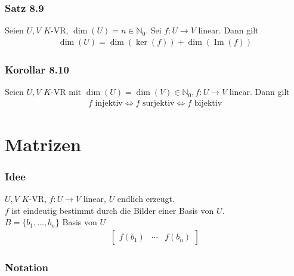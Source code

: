 \documentclass[a5paper, 10pt]{book}
\DeclareMathOperator{\romanIm}{Im}
\newcommand{\inN}{\in\mathbb{N}}
\begin{document}
			\subsubsection{Satz 8.9}
				Seien $U,V$ $K$-VR, $\dim(U) = n \inN_0$. Sei $f: U \to V$ linear. Dann gilt
					\begin{align}
						\dim(U) = \dim(\ker(f)) + \dim(\romanIm(f))
					\end{align}
				
			\subsubsection{Korollar 8.10}
				Seien $U,V$ $K$-VR mit $\dim(U) = \dim(V) \inN_0, f: U \to V$ linear. Dann gilt
				\begin{align}
					f \text{ injektiv} \Longleftrightarrow f \text{ surjektiv} \Longleftrightarrow f \text{ bijektiv}
				\end{align}
			
		\section{Matrizen}
			
			\subsubsection{Idee}
				$U,V$ $K$-VR, $f: U\to V$ linear, $U$ endlich erzeugt.\\
				$f$ ist eindeutig bestimmt durch die Bilder einer Basis von $U$.\\
				$B = \{b_1, \dots, b_n\}$ Basis von $U$\\
				\begin{align}
					\begin{bmatrix}
						f(b_1)	& \cdots	& f(b_n)
					\end{bmatrix}
				\end{align}
				
			\subsubsection{Notation}
			
\end{document}
